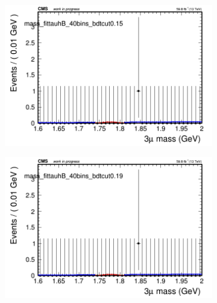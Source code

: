 \begin{figure}[H]
\begin{subfigure}{0.2\textwidth}
        \caption{}
    \end{subfigure}
    \begin{subfigure}{0.2\textwidth}
        \includegraphics[width=\textwidth]{power_law/plots/tauhB/massfit_tauhB_40bins_bdtcut0.15.png}
        \caption{}
    \end{subfigure}
    \begin{subfigure}{0.2\textwidth}
        \includegraphics[width=\textwidth]{power_law/plots/tauhB/massfit_tauhB_40bins_bdtcut0.19.png}
        \caption{}
    \end{subfigure}
    \begin{subfigure}{0.2\textwidth}

\end{subfigure}
\end{figure}
